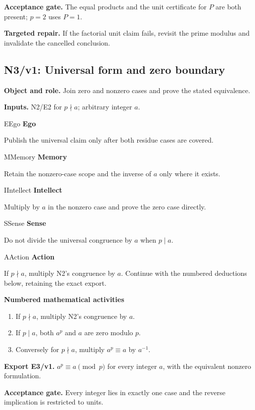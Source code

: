 \documentclass[preprint,12pt,aps,pra,showkeys,amsmath,amssymb,superscriptaddress,floatfix]{revtex4-2}
\theoremstyle{definition}
\theoremstyle{remark}
\newcommand{\mmfaculty}[3]{%
 \begin{mmfacultybox}{#1}{#2}
 {\sffamily\bfseries\color{MMBlue}#2}\par\smallskip #3
 \end{mmfacultybox}}
\newcommand{\field}[2]{\par\smallskip\noindent\textbf{#1.} #2\par}
\begin{document}
\field{Acceptance gate}{The equal products and the unit certificate for \(P\) are both present;
\(p=2\) uses \(P=1\).}

\field{Targeted repair}{If the factorial unit claim fails, revisit the prime modulus and
invalidate the cancelled conclusion.}

\clearpage

\subsection{N3/v1: Universal form and zero boundary}

\field{Object and role}{Join zero and nonzero cases and prove the stated equivalence.}

\field{Inputs}{N2/E2 for \(p\nmid a\); arbitrary integer \(a\).}

\mmfaculty{E}{Ego}{Publish the universal claim only after both residue cases are covered.}

\mmfaculty{M}{Memory}{Retain the nonzero-case scope and the inverse of \(a\) only where it
exists.}

\mmfaculty{I}{Intellect}{Multiply by \(a\) in the nonzero case and prove the zero case directly.}

\mmfaculty{S}{Sense}{Do not divide the universal congruence by \(a\) when \(p\mid a\).}

\mmfaculty{A}{Action}{If \(p\nmid a\), multiply N2's congruence by \(a\). Continue with the
numbered deductions below, retaining the exact export.}

\smallskip\noindent\textbf{Numbered mathematical activities}

\begin{enumerate}[label=N3.\arabic*,leftmargin=3.4em]

\item If \(p\nmid a\), multiply N2's congruence by \(a\).

\item If \(p\mid a\), both \(a^p\) and \(a\) are zero modulo \(p\).

\item Conversely for \(p\nmid a\), multiply \(a^p\equiv a\) by \(a^{-1}\).

\end{enumerate}

\field{Export E3/v1}{\(a^p\equiv a\pmod p\) for every integer \(a\), with the equivalent
nonzero formulation.}

\field{Acceptance gate}{Every integer lies in exactly one case and the reverse implication is
restricted to units.}
\end{document}
